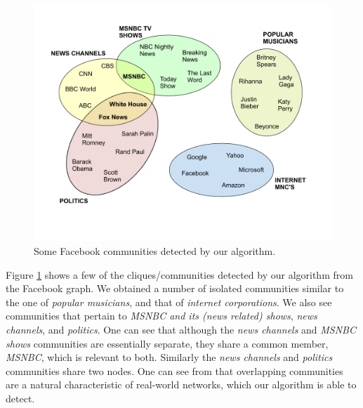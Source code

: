 \begin{figure}%
  \centering
    \includegraphics[scale=0.5]{communities_fb.pdf}
    
  \caption{Some Facebook communities detected by our algorithm.}
\label{fig-communities-fb}
\end{figure}

Figure \ref{fig-communities-fb} shows a few of the cliques/communities detected by our algorithm from the Facebook graph. We obtained a number of isolated communities similar to the one of {\it popular musicians}, and that of {\it internet corporations}. We also see communities that pertain to {\it MSNBC and its (news related) shows}, {\it news channels}, and {\it politics}. One can see that although the {\it news channels} and {\it MSNBC shows} communities are essentially separate, they share a common member, {\it MSNBC}, which is relevant to both. Similarly the {\it news channels} and {\it politics} communities share two nodes. One can see from that overlapping communities are a natural characteristic of real-world networks, which our algorithm is able to detect.



